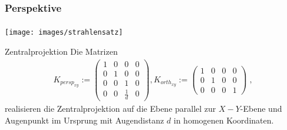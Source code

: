 \documentclass{beamer}
\begin{document}
\begin{frame}
    \frametitle{Perspektive}
\framesubtitle{}
\begin{center}
    \texttt{[image: images/strahlensatz]}
\end{center}
\begin{block}{Zentralprojektion}
Die Matrizen
\begin{align*}
K_{persp_{xy}} := \begin{pmatrix}  
1   &  0 & 0 & 0  \\
0   &  1 & 0 & 0  \\
0   &  0 & 1 & 0  \\
0   &  0 & \frac{1}{d} & 0 
\end{pmatrix} ,
K_{orth_{xy}} := \begin{pmatrix}  
1   &  0 & 0 & 0  \\
0   &  1 & 0 & 0  \\
0   &  0 & 0 & 1  
\end{pmatrix} \; ,
\end{align*}
realisieren die Zentralprojektion auf die Ebene parallel zur $X-Y$-Ebene und Augenpunkt im Ursprung mit Augendistanz $d$ in homogenen Koordinaten.


\end{block}
\end{frame}
\end{document}
